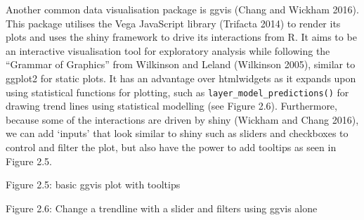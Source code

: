 \documentclass[11pt,]{report}
\newenvironment{Shaded}{\begin{snugshade}}{\end{snugshade}}
\newcommand{\KeywordTok}[1]{\textcolor[rgb]{0.13,0.29,0.53}{\textbf{#1}}}
\newcommand{\DataTypeTok}[1]{\textcolor[rgb]{0.13,0.29,0.53}{#1}}
\newcommand{\CharTok}[1]{\textcolor[rgb]{0.31,0.60,0.02}{#1}}
\newcommand{\StringTok}[1]{\textcolor[rgb]{0.31,0.60,0.02}{#1}}
\newcommand{\ControlFlowTok}[1]{\textcolor[rgb]{0.13,0.29,0.53}{\textbf{#1}}}
\newcommand{\OperatorTok}[1]{\textcolor[rgb]{0.81,0.36,0.00}{\textbf{#1}}}
\newcommand{\NormalTok}[1]{#1}
\begin{document}
Another common data visualisation package is \textsf{ggvis} (Chang and
Wickham 2016). This package utilises the Vega JavaScript library
(Trifacta 2014) to render its plots and uses the \textsf{shiny}
framework to drive its interactions from R. It aims to be an interactive
visualisation tool for exploratory analysis while following the
``Grammar of Graphics'' from Wilkinson and Leland (Wilkinson 2005),
similar to \textsf{ggplot2} for static plots. It has an advantage over
htmlwidgets as it expands upon using statistical functions for plotting,
such as \texttt{layer\_model\_predictions()} for drawing trend lines
using statistical modelling (see Figure 2.6). Furthermore, because some
of the interactions are driven by \textsf{shiny} (Wickham and Chang
2016), we can add `inputs' that look similar to shiny such as sliders
and checkboxes to control and filter the plot, but also have the power
to add tooltips as seen in Figure 2.5.

Figure 2.5: basic ggvis plot with tooltips

\begin{Shaded}
\end{Shaded}

Figure 2.6: Change a trendline with a slider and filters using ggvis
alone
\end{document}
